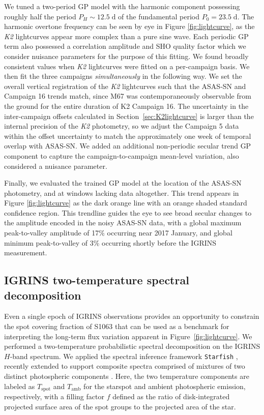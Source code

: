 \documentclass[trackchanges]{aastex631}
\begin{document}
We tuned a two-period GP model with the harmonic component possessing roughly half the period $P_H\sim12.5\;\mathrm{d}$ of the fundamental period $P_0=23.5\;\mathrm{d}$.  The harmonic overtone frequency can be seen by eye in Figure \ref{fig:lightcurve}, as the \emph{K2} lightcurves appear more complex than a pure sine wave.  Each periodic GP term also possessed a correlation amplitude and SHO quality factor which we consider nuisance parameters for the purpose of this fitting.  We found broadly consistent values when \emph{K2} lightcurves were fitted on a per-campaign basis.  We then fit the three campaigns \emph{simultaneously} in the following way.  We set the overall vertical registration of the \emph{K2} lightcurves such that the ASAS-SN and Campaign 16 trends match, since M67 was contemporaneously observable from the ground for the entire duration of K2 Campaign 16. The uncertainty in the inter-campaign offsets calculated in Section~\ref{sec:K2lightcurve} is larger than the internal precision of the \emph{K2} photometry, so we adjust the Campaign 5 data within the offset uncertainty to match the approximately one week of temporal overlap with ASAS-SN.  We added an additional non-periodic secular trend GP component to capture the campaign-to-campaign mean-level variation, also considered a nuisance parameter.

Finally, we evaluated the trained GP model at the location of the ASAS-SN photometry, and at windows lacking data altogether.  This trend appears in Figure \ref{fig:lightcurve} as the dark orange line with an orange shaded standard confidence region.  This trendline guides the eye to see broad secular changes to the amplitude encoded in the noisy ASAS-SN data, with a global maximum peak-to-valley amplitude of 17\% occurring near 2017 January, and global minimum peak-to-valley of 3\% occurring shortly before the IGRINS measurement.



\subsection{IGRINS two-temperature spectral decomposition}

Even a single epoch of IGRINS observations provides an opportunity to constrain the spot covering fraction of S1063 that can be used as a benchmark for interpreting the long-term flux variation apparent in Figure~\ref{fig:lightcurve}. We performed a two-temperature probabilistic spectral decomposition on the IGRINS $H$-band spectrum.  We applied the spectral inference framework \texttt{Starfish} \citep{czekala15}, recently extended to support composite spectra comprised of mixtures of two distinct photospheric components \citep{gullysantiago17}.  Here, the two temperature components are labeled as $T_{\mathrm{spot}}$ and $T_{\mathrm{amb}}$ for the starspot and ambient photospheric emission, respectively, with a filling factor $f$ defined as the ratio of disk-integrated projected surface area of the spot groups to the projected area of the star.
\end{document}
